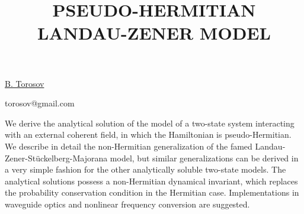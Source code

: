 \title{PSEUDO-HERMITIAN LANDAU-ZENER MODEL}

\underline{B. Torosov} 

{\normalsize{\vspace{-4mm}
\bas

\email torosov@gmail.com}}

We derive the analytical solution of the model of a two-state system interacting with an external coherent field, in which the Hamiltonian is pseudo-Hermitian.
We describe in detail the non-Hermitian generalization of the famed Landau-Zener-St\"uckelberg-Majorana model, but similar generalizations can be derived in a very simple fashion for the other analytically soluble two-state models. The analytical solutions possess a non-Hermitian dynamical invariant, which replaces the probability conservation condition in the Hermitian case. Implementations in waveguide optics and nonlinear frequency conversion are suggested.

\vspace{\baselineskip} 